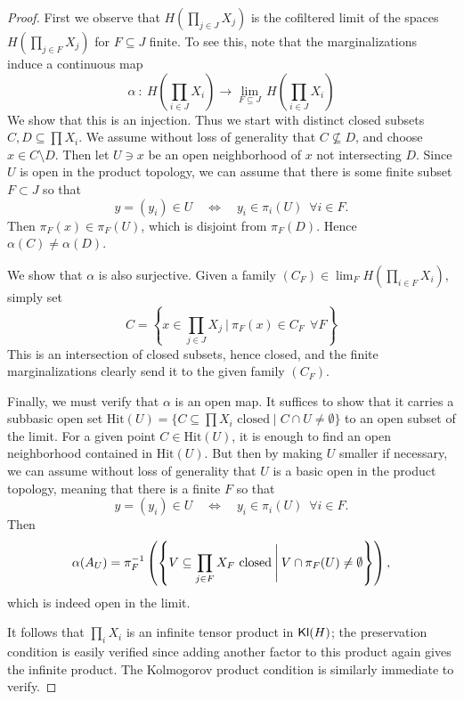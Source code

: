 \documentclass[11pt]{article}
\begin{document}
\begin{proof}
    First we observe that $H(\prod_{j\in J} X_j)$ is the cofiltered limit of the spaces
    $H(\prod_{j\in F} X_j)$ for $F \subseteq J$ finite.
    To see this, note that the marginalizations induce a continuous map
    	\[
		\alpha \: : \: H\!\left(\prod_{i\in J} X_i\right) \longrightarrow \lim_{F \subseteq J} \, H\!\left(\prod_{i \in J} X_i\right)
	\]
	We show that this is an injection. Thus we start with distinct closed subsets $C, D \subseteq \prod X_i$. We assume without loss of generality that $C \not\subseteq D$, and choose $x \in C \setminus D$.
    Then let $U \ni x$ be an open neighborhood of $x$ not intersecting $D$.
    Since $U$ is open in the product topology, we can assume that there is some finite subset $F \subset J$ so that 
    	\[
		y = (y_i) \in U \quad\Longleftrightarrow\quad y_i \in \pi_i(U) \:\;\forall i\in F.
	\]
    Then $\pi_F(x) \in \pi_F(U)$, which is disjoint from $\pi_F(D)$. Hence $\alpha(C) \neq \alpha(D)$.

    We show that $\alpha$ is also surjective. Given a family $(C_F) \in \lim_F H\!\left(\prod_{i \in F} X_i\right)$, simply set
	\[
		C = \left\{x \in \prod_{j\in J} X_j \:\Bigg|\: \pi_F(x) \in C_F \:\: \forall F\right\}
	\]
	This is an intersection of closed subsets, hence closed, and the finite marginalizations clearly send it to the given family $(C_F)$.

	Finally, we must verify that $\alpha$ is an open map.
	It suffices to show that it carries a subbasic open set $\mathrm{Hit}(U) = \{C \subseteq \prod X_i \text{ closed} \mid C \cap U \neq \emptyset\}$ to an open subset of the limit. For a given point $C \in \mathrm{Hit}(U)$, it is enough to find an open neighborhood contained in $\mathrm{Hit}(U)$. But then by making $U$ smaller if necessary, we can assume without loss of generality that $U$ is a basic open in the product topology, meaning that there is a finite $F$ so that
	\[
		y = (y_i) \in U \quad\Longleftrightarrow\quad y_i \in \pi_i(U) \:\; \forall i \in F.
	\]
    Then
	\[
		\alpha(A_U) = \pi_F^{-1}\left(\left\{V \subseteq \prod_{j \in F} X_F \text{ closed} \:\Bigg|\: V \cap \pi_F(U) \neq \emptyset\right\}\right),
	\]
    which is indeed open in the limit.

    It follows that $\prod_i X_i$ is an infinite tensor product in $\operatorname{\mathsf{Kl}}(H)$; the preservation condition is easily verified since adding another factor to this product again gives the infinite product. The Kolmogorov product condition is similarly immediate to verify.
\end{proof}
\end{document}
